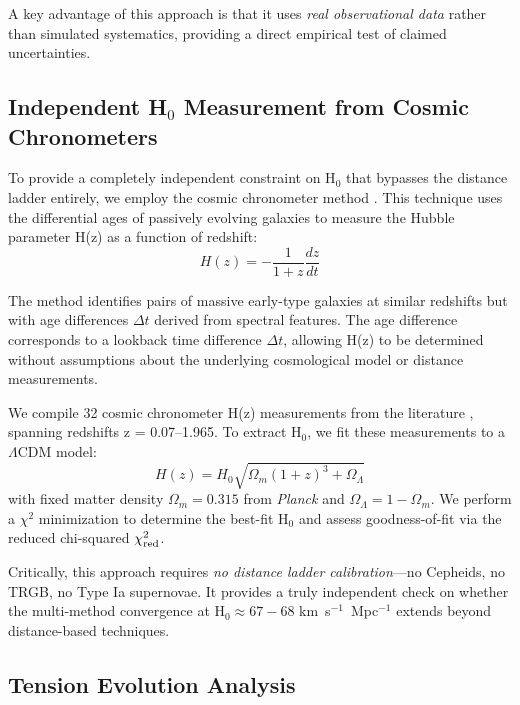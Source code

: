 \documentclass[twocolumn, linenumbers]{aastex701}
\begin{document}
A key advantage of this approach is that it uses \textit{real observational data} rather than simulated systematics, providing a direct empirical test of claimed uncertainties.

\subsection{Independent H$_0$ Measurement from Cosmic Chronometers} \label{sec:methods_h6}

To provide a completely independent constraint on H$_0$ that bypasses the distance ladder entirely, we employ the cosmic chronometer method \citep{Jimenez2002, Moresco2012}. This technique uses the differential ages of passively evolving galaxies to measure the Hubble parameter H(z) as a function of redshift:
\begin{equation}
H(z) = -\frac{1}{1+z}\frac{dz}{dt}
\end{equation}

The method identifies pairs of massive early-type galaxies at similar redshifts but with age differences $\Delta t$ derived from spectral features. The age difference corresponds to a lookback time difference $\Delta t$, allowing H(z) to be determined without assumptions about the underlying cosmological model or distance measurements.

We compile 32 cosmic chronometer H(z) measurements from the literature \citep{Moresco2022}, spanning redshifts z = 0.07--1.965. To extract H$_0$, we fit these measurements to a $\Lambda$CDM model:
\begin{equation}
H(z) = H_0 \sqrt{\Omega_m (1+z)^3 + \Omega_\Lambda}
\end{equation}
with fixed matter density $\Omega_m = 0.315$ from \textit{Planck} \citep{Planck2018} and $\Omega_\Lambda = 1 - \Omega_m$. We perform a $\chi^2$ minimization to determine the best-fit H$_0$ and assess goodness-of-fit via the reduced chi-squared $\chi^2_{\rm red}$.

Critically, this approach requires \textit{no distance ladder calibration}---no Cepheids, no TRGB, no Type Ia supernovae. It provides a truly independent check on whether the multi-method convergence at H$_0 \approx 67-68$ km~s$^{-1}$~Mpc$^{-1}$ extends beyond distance-based techniques.

\subsection{Tension Evolution Analysis} \label{sec:methods_tension}
\end{document}
